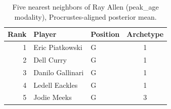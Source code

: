 \begin{table}[htbp]
  \centering\small
  \begin{tabular}{rllc}
    \toprule
    Rank & Player & Position & Archetype \\
    \midrule
    1 & Eric Piatkowski & G & 1 \\
    2 & Dell Curry & G & 1 \\
    3 & Danilo Gallinari & G & 1 \\
    4 & Ledell Eackles & G & 1 \\
    5 & Jodie Meeks & G & 3 \\
    \bottomrule
  \end{tabular}
  \caption{Five nearest neighbors of Ray Allen (peak_age modality), Procrustes-aligned posterior mean.}
  \label{tab:Ray_Allen_neighbors_peak_age}
\end{table}

